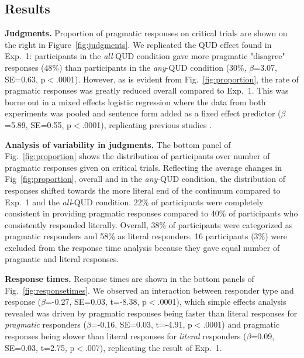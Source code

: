 \documentclass[10pt,letterpaper]{article}
\newcommand{\figref}[1]{Fig.~\ref{#1}}
\begin{document}
\subsection{Results}

\noindent \textbf{Judgments.} Proportion of pragmatic responses on critical trials are shown on the right in Figure~\ref{fig:judgments}. We replicated the QUD effect found in Exp.~1: participants in the \textit{all}-QUD condition gave more pragmatic "disagree" responses (48\%) than participants in the \textit{any}-QUD condition (30\%, $\beta$=3.07, SE=0.63, p$<$.0001). However, as is evident from \figref{fig:proportion}, the rate of pragmatic responses was greatly reduced overall compared to Exp.~1. This was borne out in a mixed effects logistic regression where the data from both experiments was  pooled and sentence form added as a fixed effect predictor ($\beta$=5.89, SE=0.55, p$<$.0001), replicating previous studies \cite{DegenTanenhaus2015,Degen2015}. 


\noindent \textbf{Analysis of variability in judgments.} The bottom panel of \figref{fig:proportion} shows the distribution of participants over number of pragmatic responses given on critical trials. Reflecting the average changes in  Fig~\ref{fig:proportion}, overall and in the \emph{any}-QUD condition, the distribution of  responses shifted towards the more literal end of the continuum compared to Exp.~1 and the \emph{all}-QUD condition.  22\% of participants were completely consistent in providing pragmatic responses compared to 40\% of participants who consistently responded literally. Overall, 38\% of participants were categorized as pragmatic responders and 58\% as literal responders. 16 participants (3\%) were excluded from the response time analysis because they gave equal number of pragmatic and literal responses.

\noindent \textbf{Response times.} Response times are shown in the bottom panels of \figref{fig:responsetimes}. We observed an interaction between responder type and response ($\beta$=-0.27, SE=0.03, t=-8.38, p$<$.0001), which simple effects analysis revealed was driven by pragmatic responses being faster than literal responses for \emph{pragmatic}  responders ($\beta$=-0.16, SE=0.03, t=-4.91, p$<$.0001) and pragmatic responses being slower than literal responses for \emph{literal} responders ($\beta$=0.09, SE=0.03, t=2.75, p$<$.007), replicating the result of Exp.~1. 
\end{document}
